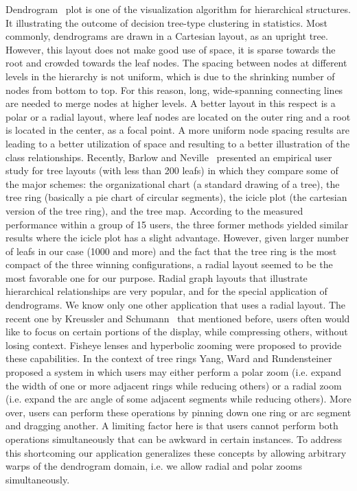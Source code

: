Dendrogram~\cite{Dendrogram} plot is one of the visualization algorithm for hierarchical structures. It illustrating the outcome of decision tree-type clustering in statistics.
Most commonly, dendrograms are drawn in a Cartesian layout, as an upright tree. However, this layout does not make good use of space, it is sparse towards the root and crowded towards the leaf nodes.
The spacing between nodes at different levels in the hierarchy is not uniform, which is due to the shrinking number of nodes from bottom to top.
For this reason, long, wide-spanning connecting lines are needed to merge nodes at higher levels.
A better layout in this respect is a polar or a radial layout, where leaf nodes are located on the outer ring and a root is located in the center, as a focal point.
A more uniform node spacing results are leading to a better utilization of space and resulting to a better illustration of the class relationships.
Recently, Barlow and Neville~\cite{Barlow_Neville} presented an empirical user study for tree layouts (with less than 200 leafs)
in which they compare some of the major schemes: the organizational chart (a standard drawing of a tree),
the tree ring (basically a pie chart of circular segments), the icicle plot (the cartesian version of the tree ring), and the tree map.
According to the measured performance within a group of 15 users,
the three former methods yielded similar results where the icicle plot has a slight advantage.
However, given larger number of leafs in our case (1000 and more) and the fact that the tree ring is the most compact of the three winning configurations,
a radial layout seemed to be the most favorable one for our purpose. Radial graph layouts that illustrate hierarchical relationships are very popular,
and for the special application of dendrograms.
We know only one other application that uses a radial layout. The recent one by Kreussler and Schumann~\cite{Kreussler_Schumann} that mentioned before,
users often would like to focus on certain portions of the display,
while compressing others, without losing context. Fisheye lenses and hyperbolic zooming were proposed to provide these capabilities.
In the context of tree rings Yang, Ward and Rundensteiner~\cite{Yang_Ward}
proposed a system in which users may either perform a polar zoom (i.e. expand the width of one or more adjacent rings while reducing others) or
a radial zoom (i.e. expand the arc angle of some adjacent segments while reducing others). More over, users can perform these operations by
pinning down one ring or arc segment and dragging another.
A limiting factor here is that users cannot perform both operations simultaneously that can be awkward in certain instances.
To address this shortcoming our application generalizes these concepts by allowing arbitrary warps of the dendrogram domain, i.e. we allow radial and polar zooms simultaneously.


